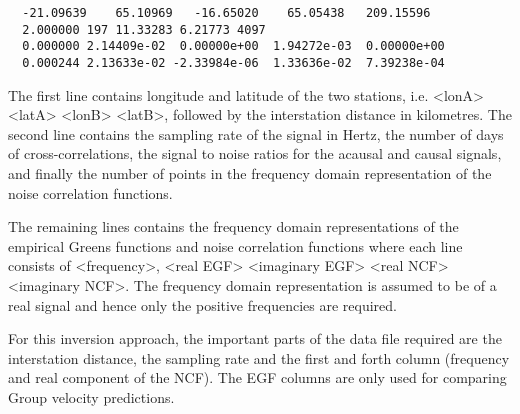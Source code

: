 \documentclass{article}
\begin{document}
\begin{verbatim}
  -21.09639    65.10969   -16.65020    65.05438   209.15596
  2.000000 197 11.33283 6.21773 4097
  0.000000 2.14409e-02  0.00000e+00  1.94272e-03  0.00000e+00
  0.000244 2.13633e-02 -2.33984e-06  1.33636e-02  7.39238e-04
\end{verbatim}

The first line contains longitude and latitude of the two stations,
i.e. <lonA> <latA> <lonB> <latB>, followed by the interstation
distance in kilometres. The second line contains the sampling rate of
the signal in Hertz, the number of days of cross-correlations, the
signal to noise ratios for the acausal and causal signals, and finally
the number of points in the frequency domain representation of the
noise correlation functions.

The remaining lines contains the frequency domain representations of
the empirical Greens functions and noise correlation functions where
each line consists of <frequency>, <real EGF> <imaginary EGF> <real
NCF> <imaginary NCF>. The frequency domain representation is assumed
to be of a real signal and hence only the positive frequencies are
required.

For this inversion approach, the important parts of the data file
required are the interstation distance, the sampling rate and the
first and forth column (frequency and real component of the NCF). The
EGF columns are only used for comparing Group velocity predictions.
\end{document}
